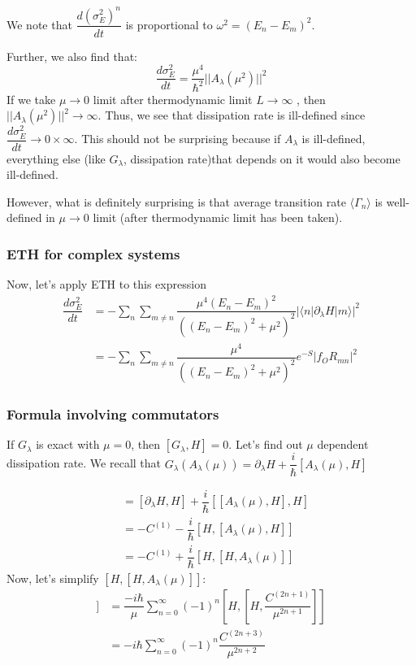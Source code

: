 \documentclass[11pt,a4paper]{article}
\begin{document}
We note that $\dfrac{d (\sigma^2_E)^{n}}{dt}$ is proportional to  $ \omega^2 = (E_n- E_m)^2$.

Further, we also find that:
\begin{equation}
\dfrac{d \sigma^2_E}{dt}= \dfrac{\mu^4}{\hbar^2} || A_{\lambda} (\mu^2)||^2
\end{equation}
If we take $\mu \rightarrow 0$ limit after thermodynamic limit $L \rightarrow \infty$ , then $|| A_{\lambda} (\mu^2)||^2 \rightarrow \infty $. Thus, we see that dissipation rate is ill-defined since $\dfrac{d \sigma^2_E}{dt} \rightarrow 0 \times \infty$. This should not be surprising because if $A_{\lambda}$ is ill-defined, everything else  (like $G_{\lambda}$, dissipation rate)that depends on it would also become ill-defined. 

However, what is definitely surprising is that average transition rate $\langle \Gamma_n \rangle$ is well-defined in $\mu \rightarrow 0$ limit (after thermodynamic limit has been taken).

\subsubsection{ETH for complex systems}



Now, let's apply ETH to this expression 
\begin{align}
\dfrac{d \sigma^2_E}{dt} &=  - \sum_{ n} \sum_{m \neq n}\dfrac{\mu^4 (E_n- E_m)^2}{((E_n-E_m)^2 + \mu^2)^2}  |\langle n |\partial_{\lambda} H |m \rangle|^2 \\
&=  - \sum_{ n} \sum_{m \neq n}\dfrac{\mu^4}{((E_n-E_m)^2 + \mu^2)^2}  e^{-S} |f_{O} R_{mn}|^2
\end{align}





\subsubsection{Formula involving commutators}
If $G_{\lambda}$ is exact with $\mu =0$, then $[G_{\lambda}, H]=0$. Let's find out $\mu$ dependent dissipation rate. We recall that $G_{\lambda}(A_{\lambda} (\mu) )= \partial_{\lambda} H + \dfrac{i}{\hbar} [A_{\lambda} (\mu), H] $

\begin{align}
[G_{\lambda}(A_{\lambda} (\mu)), H] &=[ \partial_{\lambda} H, H]  + \dfrac{i}{\hbar} [[A_{\lambda} (\mu), H],  H] \\
&=- C^{(1)}  - \dfrac{i}{\hbar} [ H, [A_{\lambda} (\mu), H]] \\
&=- C^{(1)} + \dfrac{i}{\hbar} [ H, [H, A_{\lambda} (\mu)]]
\end{align}
Now, let's simplify $[H,[H, A_{\lambda} (\mu)]]$:
\begin{align}
[H,[H, A_{\lambda} (\mu)]] &= \dfrac{-i\hbar}{\mu}  \sum_{n=0}^{\infty}   (-1)^{n} [H, [H,  \dfrac{ C^{(2n+1)}}{\mu^{2n+1}}]]\\
&= -i\hbar  \sum_{n=0}^{\infty}   (-1)^{n}   \dfrac{ C^{(2n+3)}}{\mu^{2n+2}}
\end{align}
\end{document}
